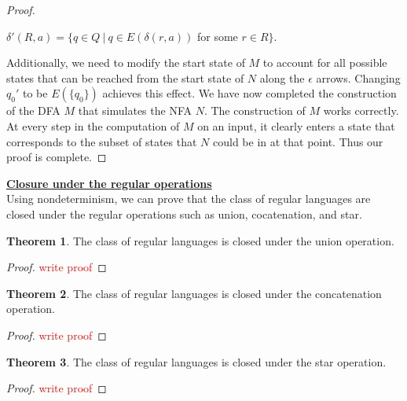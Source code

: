 \documentclass[11pt]{article}
\theoremstyle{definition}
\newtheorem{thm}{Theorem}[section]
\newcommand{\todo}{\textcolor{red}}
\begin{document}
\begin{proof}
    \begin{center}
        $\delta'(R,a) = \{q\in Q\ |\ q\in E(\delta(r,a))$ for some $r\in R\}$.
    \end{center}
    Additionally, we need to modify the start state of $M$ to account for all possible states that can be reached from the start state of $N$ along the $\epsilon$ arrows. Changing $q_0'$ to be $E(\{q_0\})$ achieves this effect. We have now completed the construction of the DFA $M$ that simulates the NFA $N$.
    The construction of $M$ works correctly. At every step in the computation of $M$ on an input, it clearly enters a state that corresponds to the subset of states that $N$ could be in at that point. Thus our proof is complete.
\end{proof}
\textbf{\underline{Closure under the regular operations}}\\
Using nondeterminism, we can prove that the class of regular languages are closed under the regular operations such as union, cocatenation, and star.
\begin{thm}
The class of regular languages is closed under the union operation.
\end{thm}
\begin{proof}
    \todo{write proof}
\end{proof}
\begin{thm}
The class of regular languages is closed under the concatenation operation.
\end{thm}
\begin{proof}
    \todo{write proof}    
\end{proof}
\begin{thm}
The class of regular languages is closed under the star operation.
\end{thm}
\begin{proof}
        \todo{write proof}
\end{proof}
\end{document}
